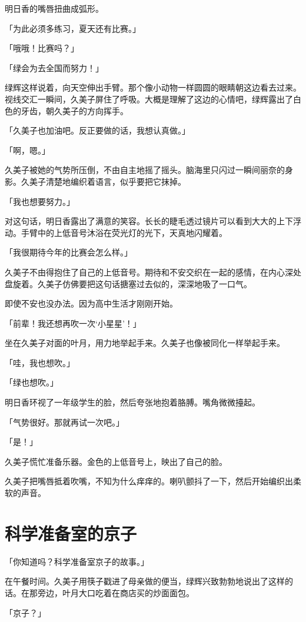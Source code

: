 \documentclass[UTF8]{ctexart}
\begin{document}
    明日香的嘴唇扭曲成弧形。

    「为此必须多练习，夏天还有比赛。」

    「哦哦！比赛吗？」

    「绿会为去全国而努力！」

    绿辉这样说着，向天空伸出手臂。那个像小动物一样圆圆的眼睛朝这边看去过来。视线交汇一瞬间，久美子屏住了呼吸。大概是理解了这边的心情吧，绿辉露出了白色的牙齿，朝久美子的方向挥手。

    「久美子也加油吧。反正要做的话，我想认真做。」

    「啊，嗯。」

    久美子被她的气势所压倒，不由自主地摇了摇头。脑海里只闪过一瞬间丽奈的身影。久美子清楚地编织着语言，似乎要把它抹掉。

    「我也想要努力。」

    对这句话，明日香露出了满意的笑容。长长的睫毛透过镜片可以看到大大的上下浮动。手臂中的上低音号沐浴在荧光灯的光下，天真地闪耀着。

    「我很期待今年的比赛会怎么样。」

    久美子不由得抱住了自己的上低音号。期待和不安交织在一起的感情，在内心深处盘旋着。久美子仿佛要把这句话搪塞过去似的，深深地吸了一口气。

    即使不安也没办法。因为高中生活才刚刚开始。

    「前辈！我还想再吹一次‘小星星’！」

    坐在久美子对面的叶月，用力地举起手来。久美子也像被同化一样举起手来。

    「哇，我也想吹。」

    「绿也想吹。」

    明日香环视了一年级学生的脸，然后夸张地抱着胳膊。嘴角微微擡起。

    「气势很好。那就再试一次吧。」

    「是！」

    久美子慌忙准备乐器。金色的上低音号上，映出了自己的脸。

    久美子把嘴唇抵着吹嘴，不知为什么痒痒的。喇叭颤抖了一下，然后开始编织出柔软的声音。
    \section{科学准备室的京子}
    「你知道吗？科学准备室京子的故事。」

    在午餐时间。久美子用筷子戳进了母亲做的便当，绿辉兴致勃勃地说出了这样的话。在那旁边，叶月大口吃着在商店买的炒面面包。

    「京子？」
\end{document}
